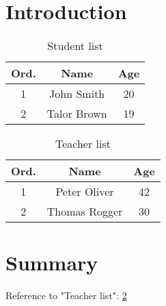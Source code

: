 \documentclass[12pt]{article}
\begin{document}
\section{Introduction}

\blindtext


\begin{table}[h]
\centering
    \begin{tabular}{c | c | c}
        Ord. & Name & Age \\
        \hline
        1 & John Smith & 20 \\
        2 & Talor Brown & 19
    \end{tabular}
\caption{Student list}
\label{tab:student_list}
\end{table}

\blindtext

\begin{table}[h]
    \centering
        \begin{tabular}{c | c | c}
            Ord. & Name & Age \\
            \hline
            1 & Peter Oliver & 42 \\
            2 & Thomas Rogger & 30
        \end{tabular}
    \caption{Teacher list}
    \label{tab:teacher_list}
    \end{table}

\blindtext

\section{Summary}

Reference to "Teacher list": \ref{tab:teacher_list}
\end{document}

